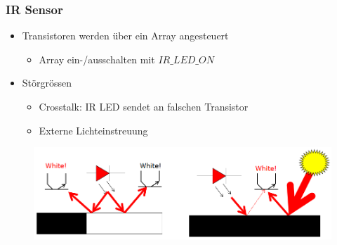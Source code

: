\documentclass{beamer}
\begin{document}
\begin{frame}
	\frametitle{IR Sensor}
	\begin{itemize}
		\item{Transistoren werden über ein Array angesteuert}
		\begin{itemize}
			\item{Array ein-/ausschalten mit $IR\_LED\_ON$}
		\end{itemize}
	\end{itemize}

	\begin{itemize}	
		\item{Störgrössen}
		\begin{itemize}
			\item{Crosstalk: IR LED sendet an falschen Transistor}
			\item{Externe Lichteinstreuung}
		\end{itemize}
	\end{itemize}

	\begin{figure}[h!]
		\centering
		\includegraphics[width=0.6\linewidth]{figure/linefollowing_disturbance.PNG}
	\end{figure}
\end{frame}


\end{document}
